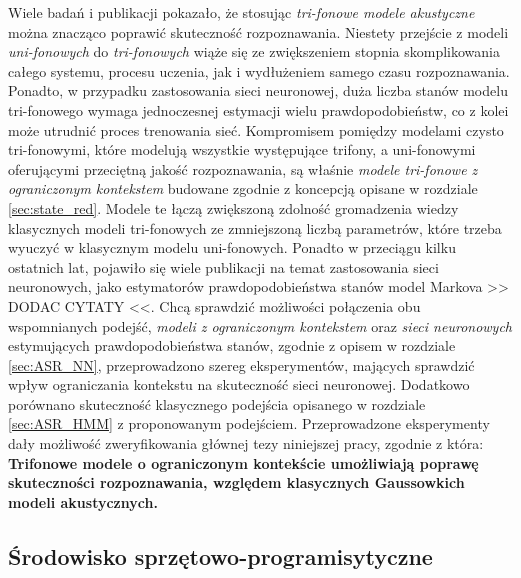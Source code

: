 \documentclass[11pt]{article}
\begin{document}
	Wiele badań i publikacji pokazało, że stosując \textit{tri-fonowe modele akustyczne} można znacząco poprawić skuteczność rozpoznawania. Niestety przejście z modeli \textit{uni-fonowych} do \textit{tri-fonowych} wiąże się ze zwiększeniem stopnia skomplikowania całego systemu, procesu uczenia, jak i wydłużeniem samego czasu rozpoznawania. Ponadto, w przypadku zastosowania sieci neuronowej, duża liczba stanów modelu tri-fonowego wymaga jednoczesnej estymacji wielu prawdopodobieństw, co z kolei może utrudnić proces trenowania sieć. Kompromisem pomiędzy modelami czysto tri-fonowymi, które modelują wszystkie występujące trifony, a uni-fonowymi oferującymi przeciętną jakość rozpoznawania, są właśnie \textit{modele tri-fonowe z ograniczonym kontekstem} budowane zgodnie z koncepcją opisane w rozdziale \ref{sec:state_red}. Modele te łączą zwiększoną zdolność gromadzenia wiedzy klasycznych modeli tri-fonowych ze zmniejszoną liczbą parametrów, które trzeba wyuczyć w klasycznym modelu uni-fonowych. Ponadto w przeciągu kilku ostatnich lat, pojawiło się wiele publikacji na temat zastosowania sieci neuronowych, jako estymatorów prawdopodobieństwa stanów model Markova >> DODAC CYTATY <<. Chcą sprawdzić możliwości połączenia obu wspomnianych podejść, \textit{modeli z ograniczonym kontekstem} oraz \textit{sieci neuronowych} estymujących prawdopodobieństwa stanów, zgodnie z opisem w rozdziale \ref{sec:ASR_NN}, przeprowadzono szereg eksperymentów, mających sprawdzić wpływ ograniczania kontekstu na skuteczność sieci neuronowej. Dodatkowo porównano skuteczność klasycznego podejścia opisanego w rozdziale \ref{sec:ASR_HMM} z proponowanym podejściem. Przeprowadzone eksperymenty dały możliwość zweryfikowania głównej tezy niniejszej pracy, zgodnie z która: \textbf{Trifonowe modele o ograniczonym kontekście umożliwiają poprawę skuteczności rozpoznawania, względem klasycznych Gaussowkich modeli akustycznych.}
	
	
	\subsection{ Środowisko sprzętowo-programisytyczne }
	\label{sec:env}
	
\end{document}

